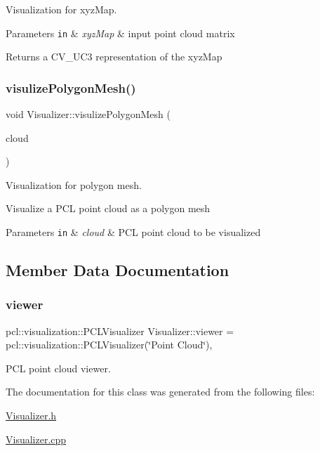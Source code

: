Visualization for xyz\+Map. 


\begin{DoxyParams}[1]{Parameters}
\mbox{\tt in}  & {\em xyz\+Map} & input point cloud matrix \\
\hline
\end{DoxyParams}
\begin{DoxyReturn}{Returns}
a C\+V\+\_\+U\+C3 representation of the xyz\+Map 
\end{DoxyReturn}
\hypertarget{class_visualizer_a82702715f2ac30e555ccad3339375bf8}{}\label{class_visualizer_a82702715f2ac30e555ccad3339375bf8} 
\subsubsection{\texorpdfstring{visulize\+Polygon\+Mesh()}{visulizePolygonMesh()}}
{\footnotesize\ttfamily void Visualizer\+::visulize\+Polygon\+Mesh (\begin{DoxyParamCaption}\item[{pcl\+::\+Point\+Cloud$<$ pcl\+::\+Point\+X\+YZ $>$\+::Ptr}]{cloud }\end{DoxyParamCaption})\hspace{0.3cm}{\ttfamily [static]}}



Visualization for polygon mesh. 

Visualize a P\+CL point cloud as a polygon mesh 
\begin{DoxyParams}[1]{Parameters}
\mbox{\tt in}  & {\em cloud} & P\+CL point cloud to be visualized \\
\hline
\end{DoxyParams}


\subsection{Member Data Documentation}
\hypertarget{class_visualizer_a82cad28f5c39579414f73bda01d11000}{}\label{class_visualizer_a82cad28f5c39579414f73bda01d11000} 
\subsubsection{\texorpdfstring{viewer}{viewer}}
{\footnotesize\ttfamily pcl\+::visualization\+::\+P\+C\+L\+Visualizer Visualizer\+::viewer = pcl\+::visualization\+::\+P\+C\+L\+Visualizer(\char`\"{}Point Cloud\char`\"{})\hspace{0.3cm}{\ttfamily [static]}, {\ttfamily [private]}}



P\+CL point cloud viewer. 



The documentation for this class was generated from the following files\+:\begin{DoxyCompactItemize}
\item 
\hyperlink{_visualizer_8h}{Visualizer.\+h}\item 
\hyperlink{_visualizer_8cpp}{Visualizer.\+cpp}\end{DoxyCompactItemize}
